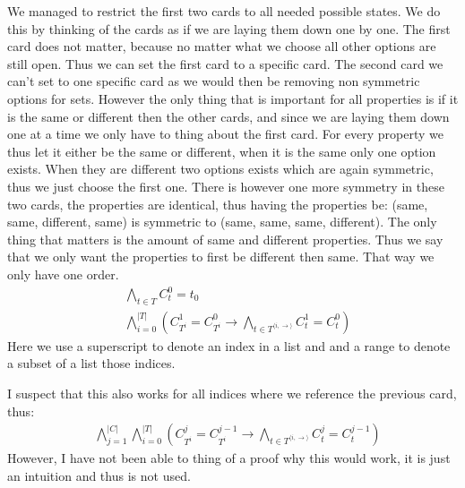 \documentclass[12pt]{scrartcl}
\begin{document}
We managed to restrict the first two cards to all needed possible states. We do this by thinking of the cards as if we are laying them down one by one. The first card does not matter, because no matter what we choose all other options are still open. Thus we can set the first card to a specific card. The second card we can't set to one specific card as we would then be removing non symmetric options for sets. However the only thing that is important for all properties is if it is the same or different then the other cards, and since we are laying them down one at a time we only have to thing about the first card. For every property we thus let it either be the same or different, when it is the same only one option exists. When they are different two options exists which are again symmetric, thus we just choose the first one. There is however one more symmetry in these two cards, the properties are identical, thus having the properties be: (same, same, different, same) is symmetric to (same, same, same, different). The only thing that matters is the amount of same and different properties. Thus we say that we only want the properties to first be different then same. That way we only have one order.
\begin{align*}
    &\bigwedge_{t\in T} C^0_t = t_0\\
    &\bigwedge_{i=0}^{|T|}\left( C^1_{T^i} = C^0_{T^i} \rightarrow \bigwedge_{t\in T^{\langle i,\rightarrow\rangle}} C^1_t = C^0_t \right)
\end{align*}
Here we use a superscript to denote an index in a list and and a range to denote a subset of a list those indices. 

I suspect that this also works for all indices where we reference the previous card, thus:
\begin{align*}
    &\bigwedge_{j=1}^{|C|}\bigwedge_{i=0}^{|T|}\left( C^j_{T^i} = C^{j-1}_{T^i} \rightarrow \bigwedge_{t\in T^{\langle i,\rightarrow\rangle}} C^j_t = C^{j-1}_t \right)
\end{align*}
However, I have not been able to thing of a proof why this would work, it is just an intuition and thus is not used.
\end{document}
